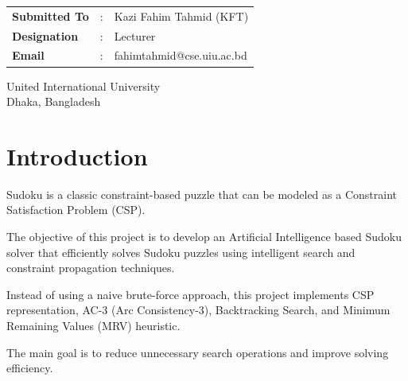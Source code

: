 \documentclass[12pt,a4paper]{article}
\begin{document}
\begin{titlepage}
\begin{center}
\begin{tabular}{>{\bfseries}l c l}
Submitted To & : & Kazi Fahim Tahmid (KFT) \\[0.2cm]

Designation & : & Lecturer \\[0.2cm]

Email & : & fahimtahmid@cse.uiu.ac.bd \\

\end{tabular}

%





\vfill


United International University\\
Dhaka, Bangladesh


\vspace{0.5cm}




\end{center}

\end{titlepage}




\tableofcontents

\newpage





\section{Introduction}


Sudoku is a classic constraint-based puzzle that can be modeled as a
Constraint Satisfaction Problem (CSP).

The objective of this project is to develop an Artificial Intelligence based
Sudoku solver that efficiently solves Sudoku puzzles using intelligent search
and constraint propagation techniques.

Instead of using a naive brute-force approach, this project implements CSP
representation, AC-3 (Arc Consistency-3), Backtracking Search, and Minimum
Remaining Values (MRV) heuristic.

The main goal is to reduce unnecessary search operations and improve solving
efficiency.
\end{document}
